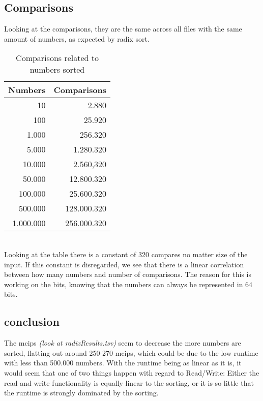 \documentclass[a4paper,10pt]{article}
\begin{document}
\subsection{Comparisons}
Looking at the comparisons, they are the same across all files with the same amount of numbers, as expected by radix sort.\\
\begin{table}[h]
	\centering
	\begin{tabular}{|r|r|}\hline
		Numbers&Comparisons\\\hline\hline
		10&2.880\\\hline
		100&25.920\\\hline
		1.000&256.320\\\hline
		5.000&1.280.320\\\hline
		10.000&2.560,320\\\hline
		50.000&12.800.320\\\hline
		100.000&25.600.320\\\hline
		500.000&128.000.320\\\hline
		1.000.000&256.000.320\\\hline
	\end{tabular}\label{table:comp} \caption{Comparisons related to numbers sorted}
\end{table}\\
Looking at the table there is a constant of 320 compares no matter size of the input. If this constant is disregarded, we see that there is a linear correlation between how many numbers and number of comparisons. The reason for this is working on the bits, knowing that the numbers can always be represented in 64 bits.

\subsection{conclusion}
The mcips \textit{(look at radixResults.tsv)} seem to decrease the more numbers are sorted, flatting out around 250-270 mcips, which could be due to the low runtime with less than 500.000 numbers. With the runtime being as linear as it is, it would seem that one of two things happen with regard to Read/Write: Either the read and write functionality is equally linear to the sorting, or it is so little that the runtime is strongly dominated by the sorting.
\end{document}
